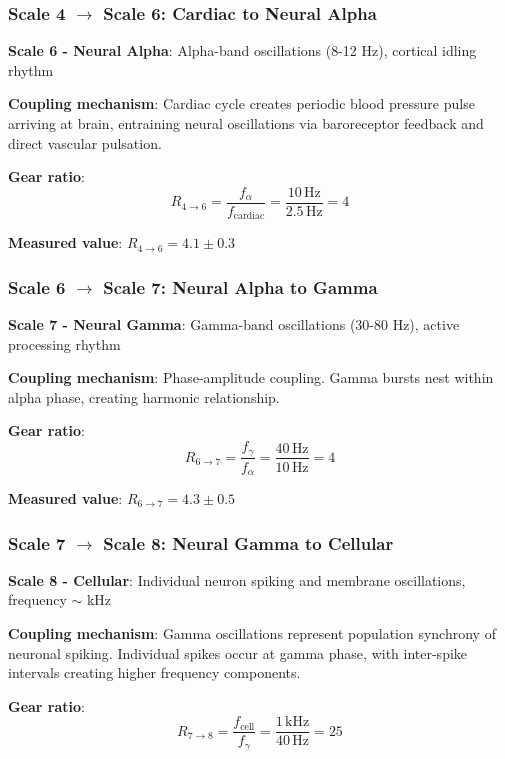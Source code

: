 \documentclass[11pt,onecolumn]{article}
\begin{document}
\subsubsection{Scale 4 $\to$ Scale 6: Cardiac to Neural Alpha}

\textbf{Scale 6 - Neural Alpha}: Alpha-band oscillations (8-12 Hz), cortical idling rhythm

\textbf{Coupling mechanism}: Cardiac cycle creates periodic blood pressure pulse arriving at brain, entraining neural oscillations via baroreceptor feedback and direct vascular pulsation.

\textbf{Gear ratio}:
\begin{equation}
R_{4 \to 6} = \frac{f_{\alpha}}{f_{\text{cardiac}}} = \frac{10\,\text{Hz}}{2.5\,\text{Hz}} = 4
\end{equation}

\textbf{Measured value}: $R_{4 \to 6} = 4.1 \pm 0.3$

\subsubsection{Scale 6 $\to$ Scale 7: Neural Alpha to Gamma}

\textbf{Scale 7 - Neural Gamma}: Gamma-band oscillations (30-80 Hz), active processing rhythm

\textbf{Coupling mechanism}: Phase-amplitude coupling. Gamma bursts nest within alpha phase, creating harmonic relationship.

\textbf{Gear ratio}:
\begin{equation}
R_{6 \to 7} = \frac{f_{\gamma}}{f_{\alpha}} = \frac{40\,\text{Hz}}{10\,\text{Hz}} = 4
\end{equation}

\textbf{Measured value}: $R_{6 \to 7} = 4.3 \pm 0.5$

\subsubsection{Scale 7 $\to$ Scale 8: Neural Gamma to Cellular}

\textbf{Scale 8 - Cellular}: Individual neuron spiking and membrane oscillations, frequency $\sim$ kHz

\textbf{Coupling mechanism}: Gamma oscillations represent population synchrony of neuronal spiking. Individual spikes occur at gamma phase, with inter-spike intervals creating higher frequency components.

\textbf{Gear ratio}:
\begin{equation}
R_{7 \to 8} = \frac{f_{\text{cell}}}{f_{\gamma}} = \frac{1\,\text{kHz}}{40\,\text{Hz}} = 25
\end{equation}
\end{document}
